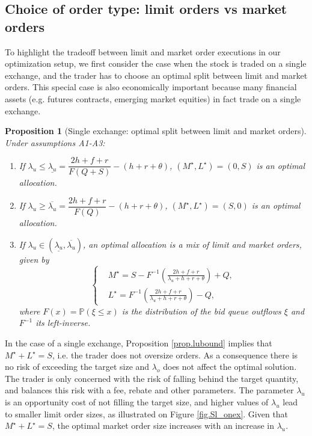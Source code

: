 \documentclass[opre,nonblindrev]{informs3}
\newtheorem{myprop}{Proposition}
\begin{document}
\subsection{Choice of order type: limit orders vs market orders}\label{sec.1exchg}

To highlight the tradeoff between limit and market order executions in our optimization setup, we first consider the case when the stock is traded on a single exchange, and the trader has to choose an optimal split between limit and market orders. This special case is also economically important because many financial assets (e.g. futures contracts, emerging market equities) in fact trade on a single exchange.  
\begin{myprop}[Single exchange: optimal split between limit and market orders]\label{prop.1exchg}
Under assumptions A1-A3:
\begin{enumerate}
\item[(i)] If $\lambda_u\leq\underline{\lambda_u}=\dfrac{2h+f+r}{F(Q+ S)}-(h+r+\theta)$, $(M^{\star},L^{\star})=(0,S)$ is an optimal allocation.
\item[(ii)]
If $\lambda_u\geq\overline{\lambda_u}=\dfrac{2h+f+r}{F(Q)}-(h+r+\theta)$, $(M^{\star},L^{\star})=(S,0)$ is an optimal allocation.
\item[(iii)]
If $\lambda_u\in(\underline{\lambda_u},\overline{\lambda_u})$, an optimal allocation is a mix of limit and market orders, given by
\begin{equation}\label{sol.1exchg}
\left\{
\begin{aligned}
& M^{\star}=S - F^{-1}\left(\frac{2h+f+r}{\lambda_u+h+r+\theta}\right)+Q, \\
& L^{\star}=F^{-1}\left(\frac{2h+f+r}{\lambda_u+h+r+\theta}\right)-Q,
\end{aligned}
\right.
\end{equation}
\noindent where $F(x)=\mathbb{P}(\xi\leq x)$ is the distribution   of the bid queue outflows $\xi$ and $F^{-1}$ its left-inverse.
\end{enumerate}
\end{myprop}

\noindent In the case of a single exchange, Proposition \ref{prop.lubound} implies that $M^{\star}+L^{\star}=S$, i.e. the trader does not oversize orders. As a consequence there is no risk of exceeding the target size and $\lambda_o$ does not affect the optimal solution. The trader is only concerned with the risk of falling behind the target quantity, and balances this risk with a fee, rebate and other parameters.  The parameter $\lambda_u$ is an opportunity cost of not filling the target size, and higher values of $\lambda_u$ lead to smaller limit order sizes, as illustrated on Figure \ref{fig.Sl_onex}. Given that $M^{\star}+L^{\star}=S$, the optimal market order size increases with an increase in $\lambda_u$.
\end{document}
